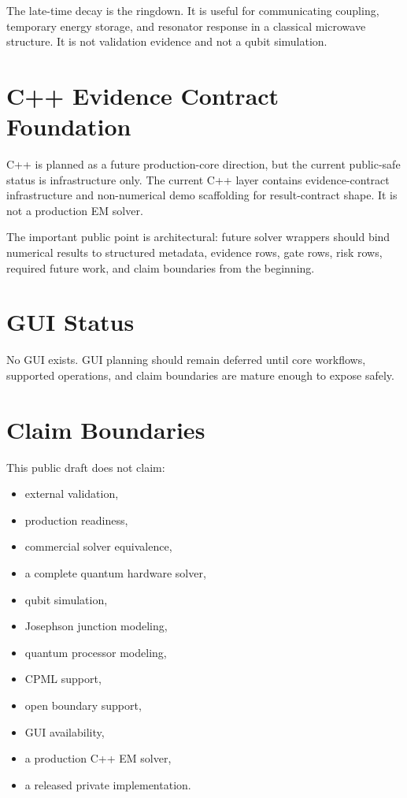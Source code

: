 \documentclass[11pt,a4paper]{article}
\begin{document}
The late-time decay is the ringdown. It is useful for communicating coupling, temporary energy storage, and resonator response in a classical microwave structure. It is not validation evidence and not a qubit simulation.

\section{C++ Evidence Contract Foundation}
\label{sec:cpp-foundation}

C++ is planned as a future production-core direction, but the current public-safe status is infrastructure only. The current C++ layer contains evidence-contract infrastructure and non-numerical demo scaffolding for result-contract shape. It is not a production EM solver.

The important public point is architectural: future solver wrappers should bind numerical results to structured metadata, evidence rows, gate rows, risk rows, required future work, and claim boundaries from the beginning.

\section{GUI Status}
\label{sec:gui-status}

No GUI exists. GUI planning should remain deferred until core workflows, supported operations, and claim boundaries are mature enough to expose safely.

\section{Claim Boundaries}
\label{sec:claim-boundaries}

This public draft does not claim:

\begin{itemize}
  \item external validation,
  \item production readiness,
  \item commercial solver equivalence,
  \item a complete quantum hardware solver,
  \item qubit simulation,
  \item Josephson junction modeling,
  \item quantum processor modeling,
  \item CPML support,
  \item open boundary support,
  \item GUI availability,
  \item a production C++ EM solver,
  \item a released private implementation.
\end{itemize}
\end{document}
